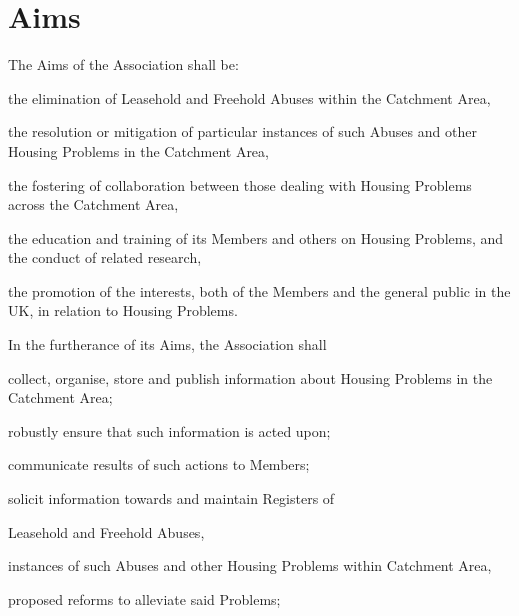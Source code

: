 \documentclass[10pt]{mk-articles-of-association}
\newcommand{\LAFA}[0]{Leasehold and Freehold Abuses}
\begin{document}

\section{Aims}
\begin{constenum}

\item The Aims of the Association shall be:

  \begin{constenum}

  \item the elimination of \LAFA{} within the Catchment Area,

  \item the resolution or mitigation of particular instances of such
    Abuses and other Housing Problems in the Catchment Area,

  \item the fostering of collaboration between those dealing with
    Housing Problems across the Catchment Area,

  \item the education and training of its Members and others on
    Housing Problems, and the conduct of related research, \ITand

  \item the promotion of the interests, both of the Members and the
    general public in the UK, in relation to Housing Problems.

  \end{constenum}

\item In the furtherance of its Aims, the Association shall
\begin{constenum}

  \item collect, organise, store and publish information about
    Housing Problems in the Catchment Area;

  \item robustly ensure that such information is acted upon;

  \item communicate results of such actions to Members;

  \item solicit information towards and maintain Registers of
    \begin{constenum}
    \item \LAFA, \ITand
    \item instances of such Abuses and other Housing Problems within
      Catchment Area,
    \item proposed reforms to alleviate said Problems;
    \end{constenum}


\end{constenum}
\end{constenum}
\end{document}
